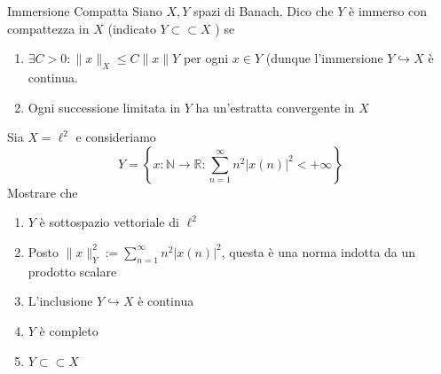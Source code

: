 \begin{definition}{Immersione Compatta}
    Siano \(X, Y\) spazi di Banach. Dico che \(Y\) è immerso con compattezza in
    \(X\) (indicato \(Y \subset \subset  X\) ) se 
\begin{enumerate}[label = \arabic*.]
    \item \(\exists C > 0 : \|x\|_X \le C\|x\|Y\) per ogni \(x \in Y\) (dunque
        l'immersione \(Y \hookrightarrow X\) è continua.
    \item Ogni successione limitata in \(Y\) ha un'estratta convergente in \(X\) 
\end{enumerate}
\end{definition}

\begin{eser}{}
    Sia \(X = \ell^2\) e consideriamo 
    \[
      Y = \left\{x : \mathbb{N}\to \mathbb{R} : \sum_{n=1}^{\infty} n^2 |x{(n)}|^2 < +\infty \right\} 
    \]
    Mostrare che
\begin{enumerate}[label = \arabic*.]
    \item \(Y\) è sottospazio vettoriale di \(\ell^2\)
    \item Posto \(\|x\|^2_Y := \sum_{n=1}^{\infty} n^2 |x{(n)}|^2 \), questa è una norma indotta da un prodotto scalare
    \item L'inclusione \(Y \hookrightarrow X\) è continua
    \item \(Y\) è completo
    \item \(Y \subset \subset X  \) 
\end{enumerate}
\tcblower
{}
\end{eser}
